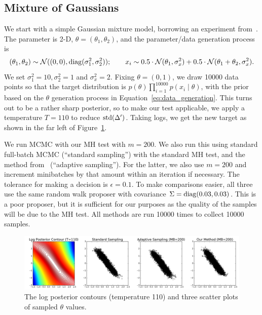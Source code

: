 \documentclass{article}
\begin{document}
\subsection{Mixture of Gaussians}\label{ssec:gaussians}

We start with a simple Gaussian mixture model, borrowing an experiment from~\cite{langevin_2011}.
The parameter is 2-D, $\theta = (\theta_1,\theta_2)$, and the parameter/data generation process is
\begin{equation}\label{eq:data_generation}
(\theta_1,\theta_2) \sim \mathcal{N}((0,0), {\rm diag}(\sigma_1^2, \sigma_2^2));\quad \quad x_i \sim
0.5 \cdot \mathcal{N}(\theta_1, \sigma_x^2) + 0.5 \cdot \mathcal{N}(\theta_1+\theta_2, \sigma_x^2).
\end{equation}
We set $\sigma_1^2 = 10, \sigma_2^2 = 1$ and $\sigma_x^2=2$. Fixing $\theta = (0,1)$, we draw 10000
data points so that the target distribution is $p(\theta)\prod_{i=1}^{10000}p(x_i\mid \theta)$, with
the prior based on the $\theta$ generation process in Equation~\ref{eq:data_generation}. This turns
out to be a rather sharp posterior, so to make our test applicable, we apply a temperature $T=110$
to reduce ${\rm std}(\Delta')$. Taking logs, we get the new target as shown in the far left of
Figure~\ref{fig:gauss_mix_1}.

We run MCMC with our MH test with $m=200$. We also run this using standard full-batch MCMC
(``standard sampling'') with the standard MH test, and the method from~\cite{cutting_mh_2014}
(``adaptive sampling''). For the latter, we also use $m=200$ and increment minibatches by that
amount within an iteration if necessary. The tolerance for making a decision is $\epsilon=0.1$. To
make comparisons easier, all three use the same random walk proposer with covariance $\Sigma={\rm
diag}(0.03, 0.03)$. This is a poor proposer, but it is sufficient for our purposes as the quality of
the samples will be due to the MH test. All methods are run 10000 times to collect 10000 samples.

\begin{figure}[t]
    \centering
    \includegraphics[width=1\linewidth]{cloud_v01.png}
    \caption{
    The log posterior contours (temperature 110) and three scatter plots of sampled $\theta$ values.
    }
    \label{fig:gauss_mix_1}
\end{figure}
\end{document}
